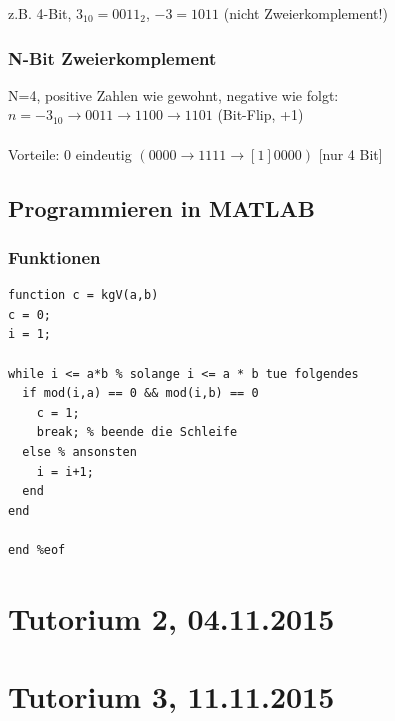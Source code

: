 \documentclass{llncs}
\begin{document}
z.B. 4-Bit, $3_{10} = 0011_2$, $-3 = 1011$ (nicht Zweierkomplement!)

\subsection*{N-Bit Zweierkomplement}

N=4, positive Zahlen wie gewohnt, negative wie folgt:\\
$n = -3_{10} \rightarrow 0011 \rightarrow 1100 \rightarrow 1101$ (Bit-Flip, +1)\\
\\
Vorteile: $0$ eindeutig $(0000 \rightarrow 1111 \rightarrow [1]0000)$ [nur 4 Bit] 

\section*{Programmieren in MATLAB}

\subsection*{Funktionen}

\begin{verbatim}
function c = kgV(a,b)
c = 0;
i = 1;

while i <= a*b % solange i <= a * b tue folgendes
  if mod(i,a) == 0 && mod(i,b) == 0
    c = 1;
    break; % beende die Schleife
  else % ansonsten
    i = i+1;
  end
end

end %eof
\end{verbatim}


\chapter*{Tutorium 2, 04.11.2015}

\chapter*{Tutorium 3, 11.11.2015}
\end{document}
